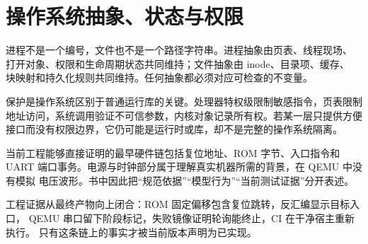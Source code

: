 \section{操作系统抽象、状态与权限}

进程不是一个编号，文件也不是一个路径字符串。进程抽象由页表、线程现场、
打开对象、权限和生命周期状态共同维持；文件抽象由 inode、目录项、缓存、
块映射和持久化规则共同维持。任何抽象都必须对应可检查的不变量。

保护是操作系统区别于普通运行库的关键。处理器特权级限制敏感指令，页表限制
地址访问，系统调用验证不可信参数，内核对象记录所有权。若某一层只提供方便
接口而没有权限边界，它仍可能是运行时或库，却不是完整的操作系统隔离。

当前工程能够直接证明的最早硬件链包括复位地址、ROM 字节、入口指令和 UART
端口事务。电源与时钟部分属于理解真实机器所需的背景，在 QEMU 中没有模拟
电压波形。书中因此把“规范依据”“模型行为”“当前测试证据”分开表述。

工程证据从最终产物向上闭合：ROM 固定偏移包含复位跳转，反汇编显示目标入口，
QEMU 串口留下阶段标记，失败镜像证明轮询能终止，CI 在干净宿主重新执行。
只有这条链上的事实才被当前版本声明为已实现。
